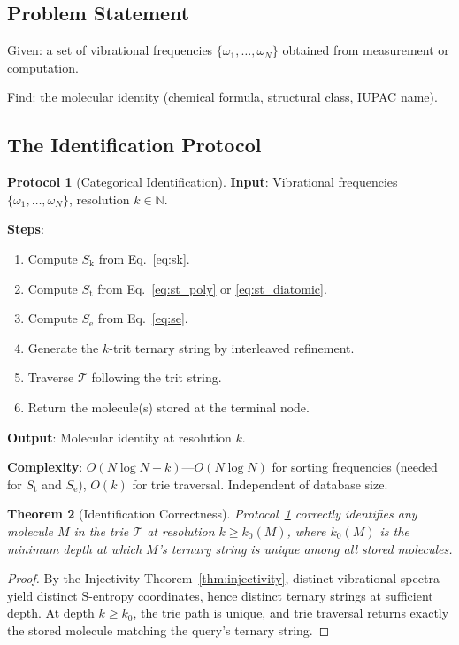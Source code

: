 \documentclass[11pt,twocolumn,a4paper]{article}
\newtheorem{theorem}{Theorem}[section]
\theoremstyle{definition}
\newtheorem{protocol}[theorem]{Protocol}
\theoremstyle{remark}
\newcommand{\Sk}{S_{\mathrm{k}}}
\newcommand{\St}{S_{\mathrm{t}}}
\newcommand{\Se}{S_{\mathrm{e}}}
\newcommand{\Natural}{\mathbb{N}}
\newcommand{\Trie}{\mathcal{T}}
\begin{document}
\subsection{Problem Statement}

Given: a set of vibrational frequencies $\{\omega_1, \ldots, \omega_N\}$ obtained from measurement or computation.

Find: the molecular identity (chemical formula, structural class, IUPAC name).

\subsection{The Identification Protocol}

\begin{protocol}[Categorical Identification]
\label{prot:identification}
\textbf{Input}: Vibrational frequencies $\{\omega_1, \ldots, \omega_N\}$, resolution $k \in \Natural$.

\textbf{Steps}:
\begin{enumerate}[nosep]
\item Compute $\Sk$ from Eq.~\eqref{eq:sk}.
\item Compute $\St$ from Eq.~\eqref{eq:st_poly} or \eqref{eq:st_diatomic}.
\item Compute $\Se$ from Eq.~\eqref{eq:se}.
\item Generate the $k$-trit ternary string by interleaved refinement.
\item Traverse $\Trie$ following the trit string.
\item Return the molecule(s) stored at the terminal node.
\end{enumerate}

\textbf{Output}: Molecular identity at resolution $k$.

\textbf{Complexity}: $O(N \log N + k)$---$O(N \log N)$ for sorting frequencies (needed for $\St$ and $\Se$), $O(k)$ for trie traversal. Independent of database size.
\end{protocol}

\begin{theorem}[Identification Correctness]
\label{thm:id_correct}
Protocol~\ref{prot:identification} correctly identifies any molecule $M$ in the trie $\Trie$ at resolution $k \geq k_0(M)$, where $k_0(M)$ is the minimum depth at which $M$'s ternary string is unique among all stored molecules.
\end{theorem}

\begin{proof}
By the Injectivity Theorem~\ref{thm:injectivity}, distinct vibrational spectra yield distinct S-entropy coordinates, hence distinct ternary strings at sufficient depth. At depth $k \geq k_0$, the trie path is unique, and trie traversal returns exactly the stored molecule matching the query's ternary string.
\end{proof}
\end{document}
